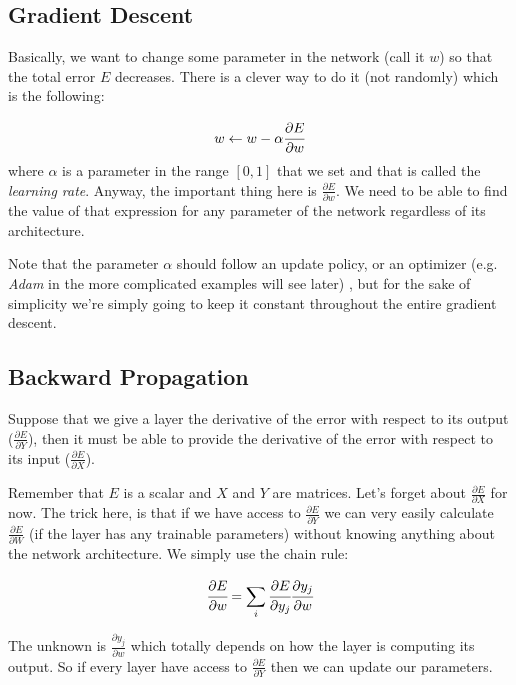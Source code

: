 \subsection{Gradient Descent}

Basically, we want to change some parameter in the network (call it $w$) so that the total error $E$ decreases. There is a clever way to do it (not randomly) which is the following:

\begin{equation}
	w\leftarrow w - \alpha\cfrac{\partial E}{\partial w}
\end{equation}
where $\alpha$ is a parameter in the range $[0,1]$ that we set and that is called the \emph{learning rate}. 
Anyway, the important thing here is $\frac{\partial E}{\partial w}$. 
We need to be able to find the value of that expression for any parameter of the network regardless of its architecture.

Note that the parameter $\alpha$ should follow an update policy, or an optimizer (e.g. \emph{Adam} in the more complicated examples will see later) , but for the sake of simplicity we’re simply going to keep it constant throughout the entire gradient descent.

\subsection{Backward Propagation}

Suppose that we give a layer the derivative of the error with respect to its output ($\frac{\partial E}{\partial Y}$), then it must be able to provide the derivative of the error with respect to its input ($\frac{\partial E}{\partial X}$).

Remember that $E$ is a scalar and $X$ and $Y$ are matrices.
Let’s forget about $\frac{\partial E}{\partial X}$ for now. The trick here, is that if we have access to $\frac{\partial E}{\partial Y}$ we can very easily calculate $\frac{\partial E}{\partial W}$ (if the layer has any trainable parameters) without knowing anything about the network architecture. We simply use the chain rule:

\begin{equation}
	\cfrac{\partial E}{\partial w} = \sum_i \cfrac{\partial E}{\partial y_j}\cfrac{\partial y_j}{\partial w}
\end{equation}

The unknown is $\frac{\partial y_j}{\partial w}$ which totally depends on how the layer is computing its output. So if every layer have access to $\frac{\partial E}{\partial Y}$ then we can update our parameters.

